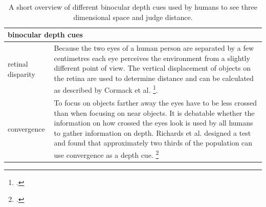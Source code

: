 \begin{table}[h!]
	\begin{tabularx}{\textwidth}{|l|X|}
		\hline
		\multicolumn{2}{|l|}{\textbf{binocular depth cues}} \\
		\hline
		retinal disparity & Because the two eyes of a human person are separated by a few centimetres each eye perceives the environment from a slightly different point of view. The vertical displacement of objects on the retina are used to determine distance and can be calculated as described by Cormack et al. \footcite{Cormack_The_computation_of_retinal_disparity}.\\
		\hline
		convergence & To focus on objects farther away the eyes have to be less crossed than when focusing on near objects. It is debatable whether the information on how crossed the eyes look is used by all humans to gather information on depth. Richards et al. designed a test and found that approximately two thirds of the population can use convergence as a depth cue. \footcite{Richards_Convergence_as_a_cue_to_depth} \\
		\hline
	\end{tabularx}
	\label{tab:study_of_literature_binocular_depth_cues}
	\caption{A short overview of different binocular depth cues used by humans to see three dimensional space and judge distance.}
\end{table}

\newpage

